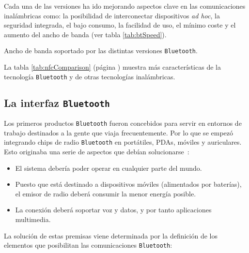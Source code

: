 Cada una de las versiones ha ido mejorando aspectos clave en las comunicaciones
inalámbricas como: la posibilidad de interconectar dispositivos \emph{ad hoc},
la seguridad integrada, el bajo consumo, la facilidad de uso, el mínimo coste
y el aumento del ancho de banda (ver tabla \ref{tab:btSpeed}).

\begin{table}[H]
  \centering
  \label{tab:btSpeed}
  {\normalsize
  
  }
  \caption[Ancho de banda soportado por las distintas versiones
  \texttt{Bluetooth}.]
  {Ancho de banda soportado por las distintas versiones \texttt{Bluetooth}.}
\end{table}

La tabla \ref{tab:nfcComparison} (página \pageref{tab:nfcComparison}) muestra
más características de la tecnología \texttt{Bluetooth} y de otras tecnologías
inalámbricas.

  \subsection{La interfaz \texttt{Bluetooth}}
Los primeros productos \texttt{Bluetooth} fueron concebidos para servir en
entornos de trabajo destinados a la gente que viaja frecuentemente. Por lo
que se empezó integrando chips de radio \texttt{Bluetooth} en portátiles,
\acs{PDA}s, móviles y auriculares. Esto originaba una serie de aspectos que
debían solucionarse~\cite{bib:btInterface}:
\begin{itemize}
\item El sistema debería poder operar en cualquier parte del mundo.
\item Puesto que está destinado a dispositivos móviles (alimentados por
baterías), el emisor de radio deberá consumir la menor energía posible.
\item La conexión deberá soportar voz y datos, y por tanto aplicaciones
multimedia.
\end{itemize}

La solución de estas premisas viene determinada por la definición de los
elementos que posibilitan las comunicaciones \texttt{Bluetooth}:

